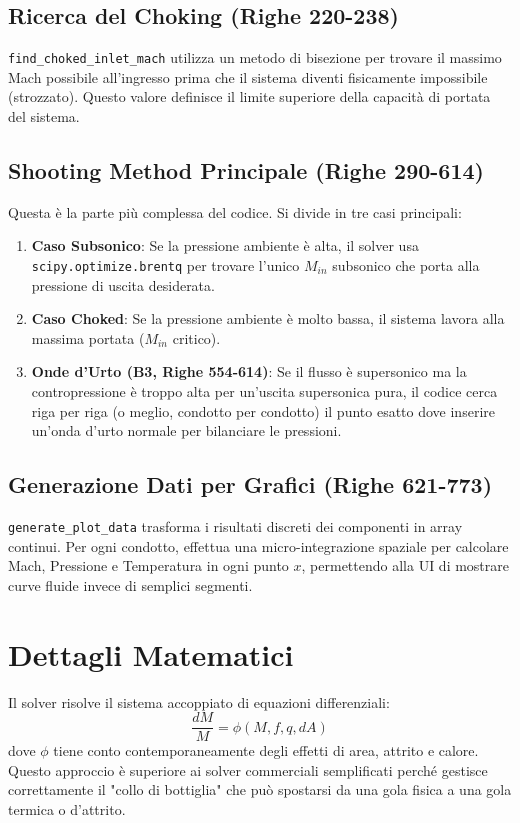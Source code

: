 \documentclass[11pt,a4paper]{article}
\begin{document}
\subsection{Ricerca del Choking (Righe 220-238)}
\texttt{find\_choked\_inlet\_mach} utilizza un metodo di bisezione per trovare il massimo Mach possibile all'ingresso prima che il sistema diventi fisicamente impossibile (strozzato). Questo valore definisce il limite superiore della capacità di portata del sistema.

\subsection{Shooting Method Principale (Righe 290-614)}
Questa è la parte più complessa del codice. Si divide in tre casi principali:
\begin{enumerate}
    \item \textbf{Caso Subsonico}: Se la pressione ambiente è alta, il solver usa \texttt{scipy.optimize.brentq} per trovare l'unico $M_{in}$ subsonico che porta alla pressione di uscita desiderata.
    \item \textbf{Caso Choked}: Se la pressione ambiente è molto bassa, il sistema lavora alla massima portata ($M_{in}$ critico).
    \item \textbf{Onde d'Urto (B3, Righe 554-614)}: Se il flusso è supersonico ma la contropressione è troppo alta per un'uscita supersonica pura, il codice cerca riga per riga (o meglio, condotto per condotto) il punto esatto dove inserire un'onda d'urto normale per bilanciare le pressioni.
\end{enumerate}

\subsection{Generazione Dati per Grafici (Righe 621-773)}
\texttt{generate\_plot\_data} trasforma i risultati discreti dei componenti in array continui. Per ogni condotto, effettua una micro-integrazione spaziale per calcolare Mach, Pressione e Temperatura in ogni punto $x$, permettendo alla UI di mostrare curve fluide invece di semplici segmenti.

\section{Dettagli Matematici}
Il solver risolve il sistema accoppiato di equazioni differenziali:
\begin{equation}
    \frac{dM}{M} = \phi(M, f, q, dA)
\end{equation}
dove $\phi$ tiene conto contemporaneamente degli effetti di area, attrito e calore. Questo approccio è superiore ai solver commerciali semplificati perché gestisce correttamente il "collo di bottiglia" che può spostarsi da una gola fisica a una gola termica o d'attrito.
\end{document}

